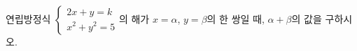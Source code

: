 연립방정식 $\begin{cases} 2x+y=k \\ x^2+y^2=5 \end{cases}$의 해가 $x=\alpha$, $y=\beta$의 한 쌍일 때, $\alpha+\beta$의 값을 구하시오. 
